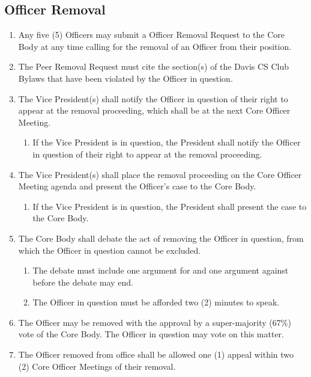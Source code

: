 \documentclass{article}
\newenvironment{li}{
\begin{enumerate}
  \setlength{\itemsep}{1pt}
  \setlength{\parskip}{0pt}
  \setlength{\parsep}{0pt}
}{\end{enumerate}}
\begin{document}
\subsection{Officer Removal}
\begin{li}
\item Any five (5) Officers may submit a Officer Removal Request to the Core Body at any time calling for the removal of an Officer from their position.
\item The Peer Removal Request must cite the section(s) of the Davis CS Club Bylaws that have been violated by the Officer in question.
\item The Vice President(s) shall notify the Officer in question of their right to appear at the removal proceeding, which shall be at the next Core Officer Meeting.
	\begin{li}
	\item If the Vice President is in question, the President shall notify the Officer in question of their right to appear at the removal proceeding.
	\end{li}
\item The Vice President(s) shall place the removal proceeding on the Core Officer Meeting agenda and present the Officer's case to the Core Body.
	\begin{li}
	\item If the Vice President is in question, the President shall present the case to the Core Body.
	\end{li}
\item The Core Body shall debate the act of removing the Officer in question, from which the Officer in question cannot be excluded.
	\begin{li}
	\item The debate must include one argument for and one argument against before the debate may end.
	\item The Officer in question must be afforded two (2) minutes to speak.
	\end{li}
\item The Officer may be removed with the approval by a super-majority (67\%) vote of the Core Body. The Officer in question may vote on this matter.
\item The Officer removed from office shall be allowed one (1) appeal within two (2) Core Officer Meetings of their removal.
\end{li}
\end{document}
